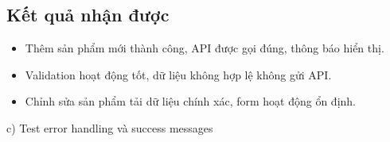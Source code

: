 \documentclass[a4paper,12pt]{article}
\begin{document}
\subsection*{Kết quả nhận được}
\begin{itemize}
    \item Thêm sản phẩm mới thành công, API được gọi đúng, thông báo hiển thị.
    \item Validation hoạt động tốt, dữ liệu không hợp lệ không gửi API.
    \item Chỉnh sửa sản phẩm tải dữ liệu chính xác, form hoạt động ổn định.
\end{itemize}
c) Test error handling và success messages
\end{document}
